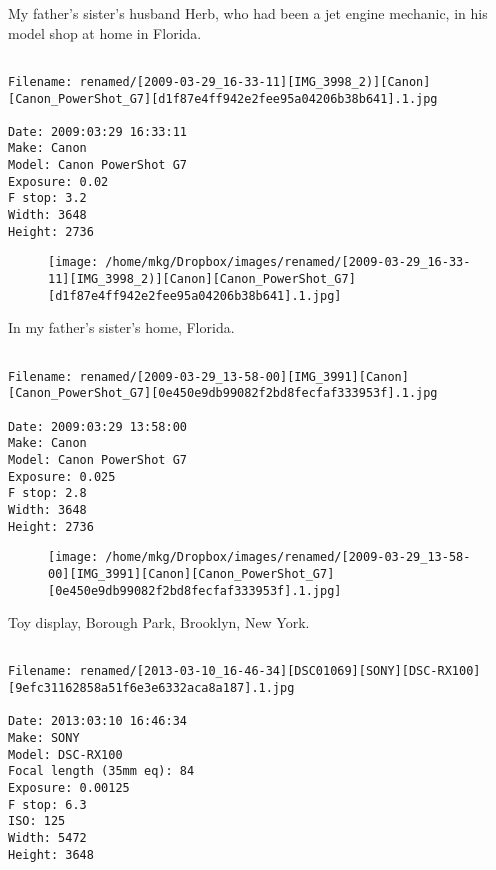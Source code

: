 \clearpage
\onecolumn
\noindent My father's sister's husband Herb, who had been a jet engine mechanic, in his model shop at home in Florida.
\noindent
\begin{lstlisting}

Filename: renamed/[2009-03-29_16-33-11][IMG_3998_2)][Canon][Canon_PowerShot_G7][d1f87e4ff942e2fee95a04206b38b641].1.jpg

Date: 2009:03:29 16:33:11
Make: Canon
Model: Canon PowerShot G7
Exposure: 0.02
F stop: 3.2
Width: 3648
Height: 2736
\end{lstlisting}
\clearpage

\begin{figure}
\texttt{[image: /home/mkg/Dropbox/images/renamed/[2009-03-29\_16-33-11][IMG\_3998\_2)][Canon][Canon\_PowerShot\_G7][d1f87e4ff942e2fee95a04206b38b641].1.jpg]}
\end{figure}
    
\clearpage
\onecolumn
\noindent In my father's sister's home, Florida.
\noindent
\begin{lstlisting}

Filename: renamed/[2009-03-29_13-58-00][IMG_3991][Canon][Canon_PowerShot_G7][0e450e9db99082f2bd8fecfaf333953f].1.jpg

Date: 2009:03:29 13:58:00
Make: Canon
Model: Canon PowerShot G7
Exposure: 0.025
F stop: 2.8
Width: 3648
Height: 2736
\end{lstlisting}
\clearpage

\begin{figure}
\texttt{[image: /home/mkg/Dropbox/images/renamed/[2009-03-29\_13-58-00][IMG\_3991][Canon][Canon\_PowerShot\_G7][0e450e9db99082f2bd8fecfaf333953f].1.jpg]}
\end{figure}
    
\clearpage
\onecolumn
\noindent Toy display, Borough Park, Brooklyn, New York.
\noindent
\begin{lstlisting}

Filename: renamed/[2013-03-10_16-46-34][DSC01069][SONY][DSC-RX100][9efc31162858a51f6e3e6332aca8a187].1.jpg

Date: 2013:03:10 16:46:34
Make: SONY
Model: DSC-RX100
Focal length (35mm eq): 84
Exposure: 0.00125
F stop: 6.3
ISO: 125
Width: 5472
Height: 3648
\end{lstlisting}
\clearpage

